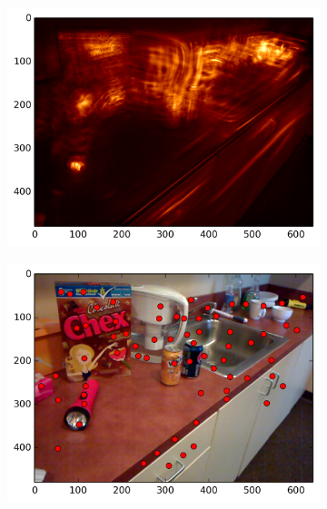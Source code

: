 \begin{figure}[ht]
\begin{subfigure}[]{0.25\linewidth}\label{fig:kit_smag_1}\includegraphics[width=\linewidth]{figures/kitchen_smag_3}\end{subfigure}%
\begin{subfigure}[]{0.25\linewidth}\label{fig:kit_feats_1}\includegraphics[width=\linewidth]{figures/kitchen_feats_3}\end{subfigure}%

\end{figure}
